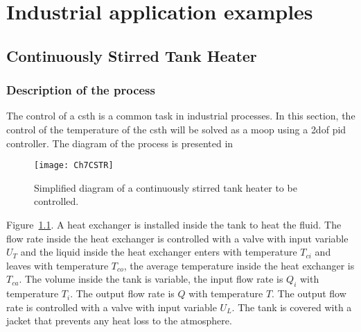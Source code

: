\chapter{Industrial application examples}
\label{chap:ApplicationExamples}
%
%

%
\section{Continuously Stirred Tank Heater}
\label{sec:CSTH}
%
\subsection{Description of the process}
\label{sec:DescriptionCSTH}
%
The control of a \gls{csth} is a common task in industrial processes. In this section, the control of the temperature of the \gls{csth} will be solved as a \gls{moop} using a \gls{2dof} \gls{pid} controller. The diagram of the process is presented in %
\begin{figure}[bt]
	\centering
	\texttt{[image: Ch7CSTR]}
	\caption{Simplified diagram of a continuously stirred tank heater to be controlled.}
	\label{fig:Ch7CSTR}
\end{figure}
Figure~\ref{fig:Ch7CSTR}. A heat exchanger is installed inside the tank to heat the fluid. The flow rate inside the heat exchanger is controlled with a valve with input variable $U_T$ and the liquid inside the heat exchanger enters with temperature $T_{ci}$ and leaves with temperature $T_{co}$, the average temperature inside the heat exchanger is $T_{ca}$. The volume inside the tank is variable, the input flow rate is $Q_i$ with temperature $T_i$. The output flow rate is $Q$ with temperature $T$. The output flow rate is controlled with a valve with input variable $U_L$. The tank is covered with a jacket that prevents any heat loss to the atmosphere.

